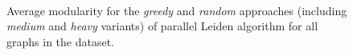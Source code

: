 \begin{figure}[hbtp]
  \centering
   \\[-2ex]
  \caption{Average modularity for the \textit{greedy} and \textit{random} approaches (including \textit{medium} and \textit{heavy} variants) of parallel Leiden algorithm for all graphs in the dataset.}
  \label{fig:leidenopt-modularity}
\end{figure}
